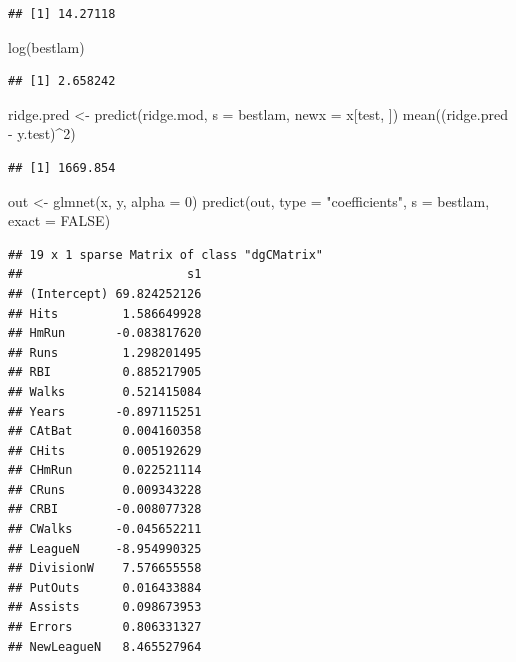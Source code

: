 \documentclass[
  12pt,
]{book}
\newenvironment{Shaded}{\begin{snugshade}}{\end{snugshade}}
\newcommand{\AttributeTok}[1]{\textcolor[rgb]{0.77,0.63,0.00}{#1}}
\newcommand{\ConstantTok}[1]{\textcolor[rgb]{0.00,0.00,0.00}{#1}}
\newcommand{\DecValTok}[1]{\textcolor[rgb]{0.00,0.00,0.81}{#1}}
\newcommand{\FunctionTok}[1]{\textcolor[rgb]{0.00,0.00,0.00}{#1}}
\newcommand{\NormalTok}[1]{#1}
\newcommand{\OtherTok}[1]{\textcolor[rgb]{0.56,0.35,0.01}{#1}}
\newcommand{\SpecialCharTok}[1]{\textcolor[rgb]{0.00,0.00,0.00}{#1}}
\newcommand{\StringTok}[1]{\textcolor[rgb]{0.31,0.60,0.02}{#1}}
\theoremstyle{definition}
\theoremstyle{definition}
\theoremstyle{definition}
\theoremstyle{definition}
\theoremstyle{remark}
\begin{document}
\begin{Shaded}
\end{Shaded}

\begin{verbatim}
## [1] 14.27118
\end{verbatim}

\begin{Shaded}
\begin{Highlighting}[]
\FunctionTok{log}\NormalTok{(bestlam)}
\end{Highlighting}
\end{Shaded}

\begin{verbatim}
## [1] 2.658242
\end{verbatim}

\begin{Shaded}
\begin{Highlighting}[]
\NormalTok{ridge.pred }\OtherTok{\textless{}{-}} \FunctionTok{predict}\NormalTok{(ridge.mod, }\AttributeTok{s =}\NormalTok{ bestlam, }\AttributeTok{newx =}\NormalTok{ x[test,}
\NormalTok{    ])}
\FunctionTok{mean}\NormalTok{((ridge.pred }\SpecialCharTok{{-}}\NormalTok{ y.test)}\SpecialCharTok{\^{}}\DecValTok{2}\NormalTok{)}
\end{Highlighting}
\end{Shaded}

\begin{verbatim}
## [1] 1669.854
\end{verbatim}

\begin{Shaded}
\begin{Highlighting}[]
\NormalTok{out }\OtherTok{\textless{}{-}} \FunctionTok{glmnet}\NormalTok{(x, y, }\AttributeTok{alpha =} \DecValTok{0}\NormalTok{)}
\FunctionTok{predict}\NormalTok{(out, }\AttributeTok{type =} \StringTok{"coefficients"}\NormalTok{, }\AttributeTok{s =}\NormalTok{ bestlam, }\AttributeTok{exact =} \ConstantTok{FALSE}\NormalTok{)}
\end{Highlighting}
\end{Shaded}

\begin{verbatim}
## 19 x 1 sparse Matrix of class "dgCMatrix"
##                       s1
## (Intercept) 69.824252126
## Hits         1.586649928
## HmRun       -0.083817620
## Runs         1.298201495
## RBI          0.885217905
## Walks        0.521415084
## Years       -0.897115251
## CAtBat       0.004160358
## CHits        0.005192629
## CHmRun       0.022521114
## CRuns        0.009343228
## CRBI        -0.008077328
## CWalks      -0.045652211
## LeagueN     -8.954990325
## DivisionW    7.576655558
## PutOuts      0.016433884
## Assists      0.098673953
## Errors       0.806331327
## NewLeagueN   8.465527964
\end{verbatim}
\end{document}
